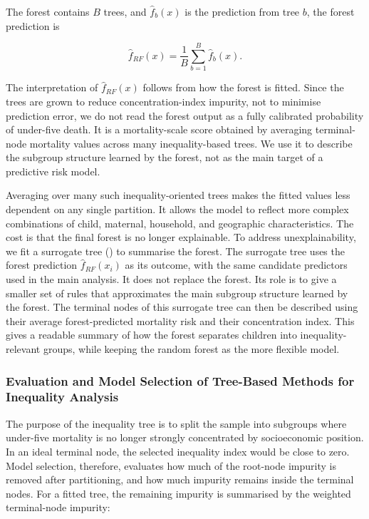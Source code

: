 \documentclass[
  11pt,
  a4paper,
]{article}
\begin{document}
The forest contains \(B\) trees, and \(\hat{f}_b(x)\) is the prediction
from tree \(b\), the forest prediction is

\[
\hat{f}_{RF}(x) = \frac{1}{B} \sum_{b=1}^{B} \hat{f}_b(x).
\]

The interpretation of \(\hat{f}_{RF}(x)\) follows from how the forest is
fitted. Since the trees are grown to reduce concentration-index
impurity, not to minimise prediction error, we do not read the forest
output as a fully calibrated probability of under-five death. It is a
mortality-scale score obtained by averaging terminal-node mortality
values across many inequality-based trees. We use it to describe the
subgroup structure learned by the forest, not as the main target of a
predictive risk model.

Averaging over many such inequality-oriented trees makes the fitted
values less dependent on any single partition. It allows the model to
reflect more complex combinations of child, maternal, household, and
geographic characteristics. The cost is that the final forest is no
longer explainable. To address unexplainability, we fit a surrogate tree
() to summarise the forest. The surrogate tree uses the
forest prediction \(\hat{f}_{RF}(x_i)\) as its outcome, with the same
candidate predictors used in the main analysis. It does not replace the
forest. Its role is to give a smaller set of rules that approximates the
main subgroup structure learned by the forest. The terminal nodes of
this surrogate tree can then be described using their average
forest-predicted mortality risk and their concentration index. This
gives a readable summary of how the forest separates children into
inequality-relevant groups, while keeping the random forest as the more
flexible model.

\subsubsection{Evaluation and Model Selection of Tree-Based Methods for
Inequality Analysis}\label{sec-model-selection}

The purpose of the inequality tree is to split the sample into subgroups
where under-five mortality is no longer strongly concentrated by
socioeconomic position. In an ideal terminal node, the selected
inequality index would be close to zero. Model selection, therefore,
evaluates how much of the root-node impurity is removed after
partitioning, and how much impurity remains inside the terminal nodes.
For a fitted tree, the remaining impurity is summarised by the weighted
terminal-node impurity:
\end{document}
